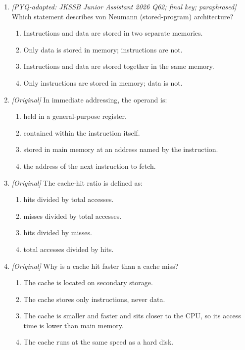 \begin{enumerate}[label=\textbf{Q\arabic*.}, leftmargin=*]
\item \textit{[PYQ-adapted: JKSSB Junior Assistant 2026 Q62; final key;
paraphrased]} Which statement describes von Neumann (stored-program)
architecture?
  \begin{enumerate}[label=\Alph*.]
    \item Instructions and data are stored in two separate memories.
    \item Only data is stored in memory; instructions are not.
    \item Instructions and data are stored together in the same memory.
    \item Only instructions are stored in memory; data is not.
  \end{enumerate}
\item \textit{[Original]} In immediate addressing, the operand is:
  \begin{enumerate}[label=\Alph*.]
    \item held in a general-purpose register.
    \item contained within the instruction itself.
    \item stored in main memory at an address named by the instruction.
    \item the address of the next instruction to fetch.
  \end{enumerate}
\item \textit{[Original]} The cache-hit ratio is defined as:
  \begin{enumerate}[label=\Alph*.]
    \item hits divided by total accesses.
    \item misses divided by total accesses.
    \item hits divided by misses.
    \item total accesses divided by hits.
  \end{enumerate}
\item \textit{[Original]} Why is a cache hit faster than a cache miss?
  \begin{enumerate}[label=\Alph*.]
    \item The cache is located on secondary storage.
    \item The cache stores only instructions, never data.
    \item The cache is smaller and faster and sits closer to the CPU, so its
      access time is lower than main memory.
    \item The cache runs at the same speed as a hard disk.

\end{enumerate}
\end{enumerate}
